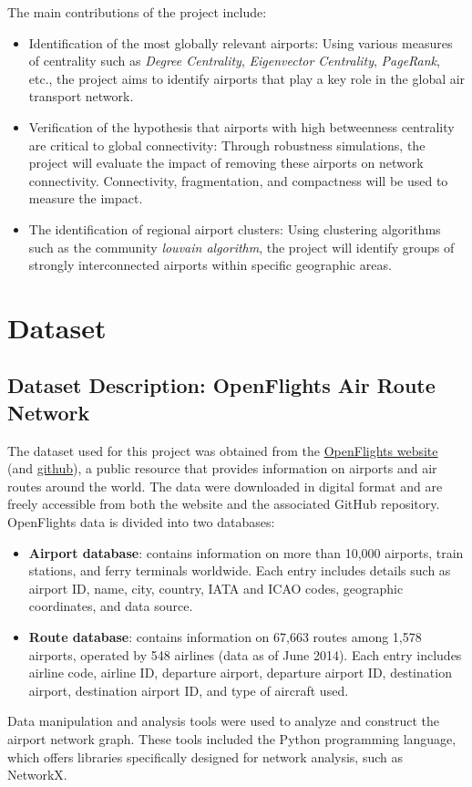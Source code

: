 \documentclass[12pt]{article}
\begin{document}
    The main contributions of the project include:

    \begin{itemize}
        \item Identification of the most globally relevant airports: Using various measures of centrality such as \textit{Degree Centrality}, \textit{Eigenvector Centrality}, \textit{PageRank}, etc., the project aims to identify airports that play a key role in the global air transport network.
        \item Verification of the hypothesis that airports with high betweenness centrality are critical to global connectivity: Through robustness simulations, the project will evaluate the impact of removing these airports on network connectivity. Connectivity, fragmentation, and compactness will be used to measure the impact.
        \item The identification of regional airport clusters: Using clustering algorithms such as the community \textit{louvain algorithm}, the project will identify groups of strongly interconnected airports within specific geographic areas.
    \end{itemize}


    \section{Dataset}\label{sec:dataset}

    \subsection{Dataset Description: OpenFlights Air Route Network}\label{subsec:dataset-description:-openflights-air-route-network}
    The dataset used for this project was obtained from the \hyperlink{https://openflights.org/}{OpenFlights website} (and \hyperlink{https://github.com/jpatokal/openflights}{github}), a public resource that provides information on airports and air routes around the world.
    The data were downloaded in digital format and are freely accessible from both the website and the associated GitHub repository.
    OpenFlights data is divided into two databases:
    \begin{itemize}
        \item \textbf{Airport database}: contains information on more than 10,000 airports, train stations, and ferry terminals worldwide. Each entry includes details such as airport ID, name, city, country, IATA and ICAO codes, geographic coordinates, and data source.
        \item \textbf{Route database}: contains information on 67,663 routes among 1,578 airports, operated by 548 airlines (data as of June 2014). Each entry includes airline code, airline ID, departure airport, departure airport ID, destination airport, destination airport ID, and type of aircraft used.
    \end{itemize}
    Data manipulation and analysis tools were used to analyze and construct the airport network graph. These tools included the Python programming language, which offers libraries specifically designed for network analysis, such as NetworkX.
\end{document}
